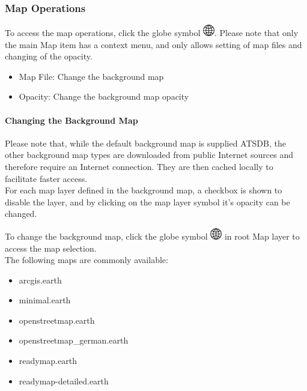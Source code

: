  \subsubsection{Map Operations}

To access the map operations, click the globe symbol \includegraphics[width=0.5cm,frame]{../../data/icons/globe.png}. Please note that only the main Map item has a context menu, and only allows setting of map files and changing of the opacity.

\begin{itemize}
 \item Map File: Change the background map
 \item Opacity: Change the background map opacity
\end{itemize} 

\paragraph{Changing the Background Map}

Please note that, while the default background map is supplied ATSDB, the other background map types are downloaded from public Internet sources and therefore require an Internet connection. They are then cached locally to facilitate faster access. \\

For each map layer defined in the background map, a checkbox is shown to disable the layer, and by clicking on the map layer symbol it's opacity can be changed.

To change the background map, click the globe symbol \includegraphics[width=0.5cm,frame]{../../data/icons/globe.png} in root Map layer to access the map selection. \\

The following maps are commonly available:

\begin{itemize}
 \item arcgis.earth
 \item minimal.earth
 \item openstreetmap.earth
 \item openstreetmap\_german.earth
 \item readymap.earth
 \item readymap-detailed.earth
\end{itemize}
 \ \\
 
